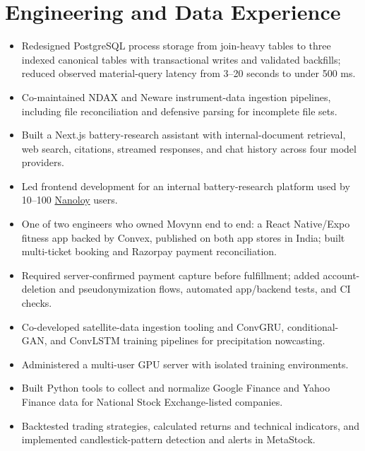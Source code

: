 \section{Engineering and Data Experience}
\begin{itemize}
  \item Redesigned PostgreSQL process storage from join-heavy tables to three indexed canonical tables with transactional writes and validated backfills; reduced observed material-query latency from 3--20 seconds to under 500 ms.
  \item Co-maintained NDAX and Neware instrument-data ingestion pipelines, including file reconciliation and defensive parsing for incomplete file sets.
  \item Built a Next.js battery-research assistant with internal-document retrieval, web search, citations, streamed responses, and chat history across four model providers.
  \item Led frontend development for an internal battery-research platform used by 10--100 \href{https://www.nanoloy.com}{Nanoloy} users.
\end{itemize}
\begin{itemize}
  \item One of two engineers who owned Movynn end to end: a React Native/Expo fitness app backed by Convex, published on both app stores in India; built multi-ticket booking and Razorpay payment reconciliation.
  \item Required server-confirmed payment capture before fulfillment; added account-deletion and pseudonymization flows, automated app/backend tests, and CI checks.
\end{itemize}
\begin{itemize}
  \item Co-developed satellite-data ingestion tooling and ConvGRU, conditional-GAN, and ConvLSTM training pipelines for precipitation nowcasting.
  \item Administered a multi-user GPU server with isolated training environments.
\end{itemize}
\begin{itemize}
  \item Built Python tools to collect and normalize Google Finance and Yahoo Finance data for National Stock Exchange-listed companies.
  \item Backtested trading strategies, calculated returns and technical indicators, and implemented candlestick-pattern detection and alerts in MetaStock.
\end{itemize}
